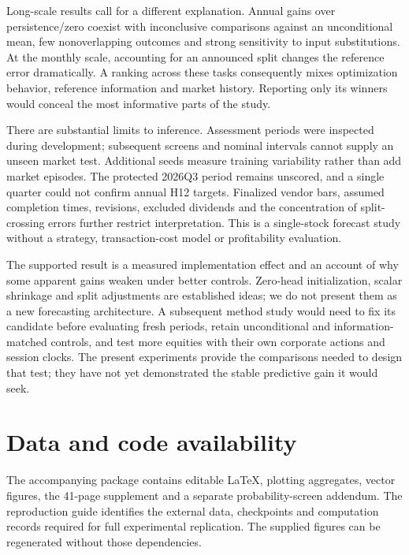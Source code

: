Long-scale results call for a different explanation. Annual gains over persistence/zero coexist with inconclusive comparisons against an unconditional mean, few nonoverlapping outcomes and strong sensitivity to input substitutions. At the monthly scale, accounting for an announced split changes the reference error dramatically. A ranking across these tasks consequently mixes optimization behavior, reference information and market history. Reporting only its winners would conceal the most informative parts of the study.

There are substantial limits to inference. Assessment periods were inspected during development; subsequent screens and nominal intervals cannot supply an unseen market test. Additional seeds measure training variability rather than add market episodes. The protected 2026Q3 period remains unscored, and a single quarter could not confirm annual H12 targets. Finalized vendor bars, assumed completion times, revisions, excluded dividends and the concentration of split-crossing errors further restrict interpretation. This is a single-stock forecast study without a strategy, transaction-cost model or profitability evaluation.

The supported result is a measured implementation effect and an account of why some apparent gains weaken under better controls. Zero-head initialization, scalar shrinkage and split adjustments are established ideas; we do not present them as a new forecasting architecture. A subsequent method study would need to fix its candidate before evaluating fresh periods, retain unconditional and information-matched controls, and test more equities with their own corporate actions and session clocks. The present experiments provide the comparisons needed to design that test; they have not yet demonstrated the stable predictive gain it would seek.

\section*{Data and code availability}

The accompanying package contains editable LaTeX, plotting aggregates, vector figures, the 41-page supplement and a separate probability-screen addendum. The reproduction guide identifies the external data, checkpoints and computation records required for full experimental replication. The supplied figures can be regenerated without those dependencies.
